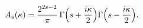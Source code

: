 \begin{equation}
A_s(\kappa)=\frac{2^{2s-2}}{\pi}\,
\Gamma\Bigl(s+\frac{i\kappa}{2}\Bigr)
\Gamma\Bigl(s-\frac{i\kappa}{2}\Bigr).
\label{As}
\end{equation}

